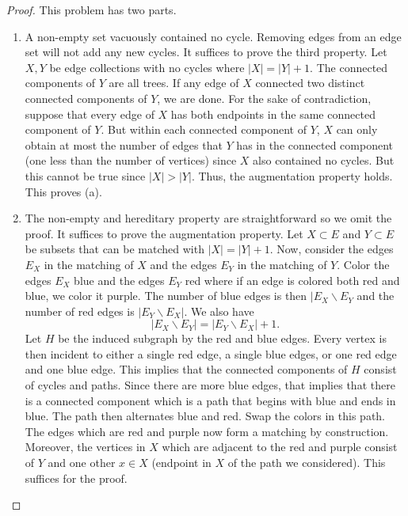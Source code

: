 \documentclass[12pt]{article}
\begin{document}
\begin{proof}
	This problem has two parts. 
	\begin{enumerate}[label = (\alph*)]
		\item A non-empty set vacuously contained no cycle. Removing edges from an edge set will not add any new cycles. It suffices to prove the third property. Let $X, Y$ be edge collections with no cycles where $|X| = |Y| + 1$. The connected components of $Y$ are all trees. If any edge of $X$ connected two distinct connected components of $Y$, we are done. For the sake of contradiction, suppose that every edge of $X$ has both endpoints in the same connected component of $Y$. But within each connected component of $Y$, $X$ can only obtain at most the number of edges that $Y$ has in the connected component (one less than the number of vertices) since $X$ also contained no cycles. But this cannot be true since $|X| > |Y|$. Thus, the augmentation property holds. This proves (a). 

		\item The non-empty and hereditary property are straightforward so we omit the proof. It suffices to prove the augmentation property. Let $X \subset E$ and $Y \subset E$ be subsets that can be matched with $|X| = |Y| + 1$. Now, consider the edges $E_X$ in the matching of $X$ and the edges $E_Y$ in the matching of $Y$. Color the edges $E_X$ blue and the edges $E_Y$ red where if an edge is colored both red and blue, we color it purple. The number of blue edges is then $|E_X \backslash E_Y$ and the number of red edges is $|E_Y \backslash E_X|$. We also have 
		\[
			|E_X \backslash E_Y| = |E_Y \backslash E_X| + 1. 
		\]
		Let $H$ be the induced subgraph by the red and blue edges. Every vertex is then incident to either a single red edge, a single blue edges, or one red edge and one blue edge. This implies that the connected components of $H$ consist of cycles and paths. Since there are more blue edges, that implies that there is a connected component which is a path that begins with blue and ends in blue. The path then alternates blue and red. Swap the colors in this path. The edges which are red and purple now form a matching by construction. Moreover, the vertices in $X$ which are adjacent to the red and purple consist of $Y$ and one other $x \in X$ (endpoint in $X$ of the path we considered). This suffices for the proof. 
	\end{enumerate}
\end{proof}

\newpage 
\end{document}
